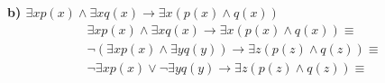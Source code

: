 \textbf{b) $\exists x p(x) \land \exists x q(x) \rightarrow \exists x (p(x) \land q(x)) $}\\

\begin{align*}
\exists x p(x) \land \exists x q(x) \rightarrow \exists x (p(x) \land q(x)) \equiv \\
\lnot (\exists x p(x) \land \exists y q(y)) \rightarrow \exists z (p(z) \land q(z)) \equiv \\
\lnot \exists x p(x) \lor \lnot \exists y q(y) \rightarrow \exists z (p(z) \land q(z)) \equiv \\
\end{align*}
